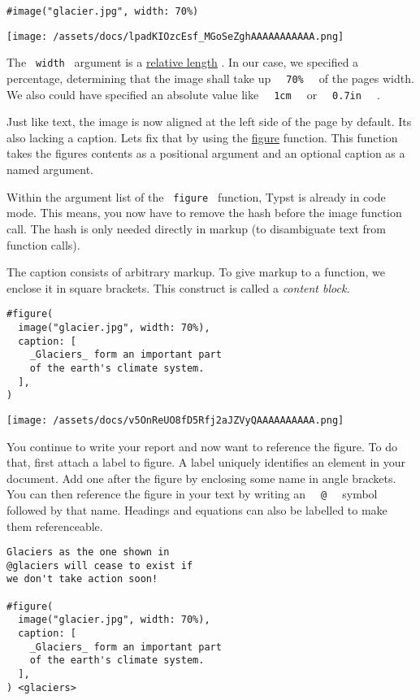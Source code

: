 \begin{verbatim}
#image("glacier.jpg", width: 70%)
\end{verbatim}

\texttt{[image: /assets/docs/lpadKIOzcEsf\_MGoSeZghAAAAAAAAAAA.png]}

The \texttt{\ width\ } argument is a
\href{/docs/reference/layout/relative/}{relative length} . In our case,
we specified a percentage, determining that the image shall take up
\texttt{\ }{\texttt{\ 70\%\ }}\texttt{\ } of the page\textquotesingle s
width. We also could have specified an absolute value like
\texttt{\ }{\texttt{\ 1cm\ }}\texttt{\ } or
\texttt{\ }{\texttt{\ 0.7in\ }}\texttt{\ } .

Just like text, the image is now aligned at the left side of the page by
default. It\textquotesingle s also lacking a caption.
Let\textquotesingle s fix that by using the
\href{/docs/reference/model/figure/}{figure} function. This function
takes the figure\textquotesingle s contents as a positional argument and
an optional caption as a named argument.

Within the argument list of the \texttt{\ figure\ } function, Typst is
already in code mode. This means, you now have to remove the hash before
the image function call. The hash is only needed directly in markup (to
disambiguate text from function calls).

The caption consists of arbitrary markup. To give markup to a function,
we enclose it in square brackets. This construct is called a
\emph{content block.}

\begin{verbatim}
#figure(
  image("glacier.jpg", width: 70%),
  caption: [
    _Glaciers_ form an important part
    of the earth's climate system.
  ],
)
\end{verbatim}

\texttt{[image: /assets/docs/v5OnReUO8fD5Rfj2aJZVyQAAAAAAAAAA.png]}

You continue to write your report and now want to reference the figure.
To do that, first attach a label to figure. A label uniquely identifies
an element in your document. Add one after the figure by enclosing some
name in angle brackets. You can then reference the figure in your text
by writing an \texttt{\ }{\texttt{\ @\ }}\texttt{\ } symbol followed by
that name. Headings and equations can also be labelled to make them
referenceable.

\begin{verbatim}
Glaciers as the one shown in
@glaciers will cease to exist if
we don't take action soon!

#figure(
  image("glacier.jpg", width: 70%),
  caption: [
    _Glaciers_ form an important part
    of the earth's climate system.
  ],
) <glaciers>
\end{verbatim}

